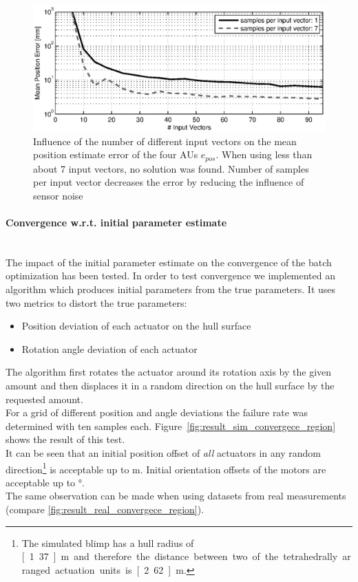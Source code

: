 \begin{figure}[hbtp]
\centering
\includegraphics[width = \textwidth]{images/results/input_length_vs_position_error.eps}
\caption{Influence of the number of different input vectors on the mean position estimate error of the four AUs $e_{pos}$.
When using less than about 7 input vectors, no solution was found.
Number of samples per input vector decreases the error by reducing the influence of sensor noise}
\label{fig:result_inputlength}
\end{figure}

\paragraph{Convergence w.r.t. initial parameter estimate} ~\\
The impact of the initial parameter estimate on the convergence of the batch optimization has been tested.
In order to test convergence we implemented an algorithm which produces initial parameters from the true parameters.
It uses two metrics to distort the true parameters:
\begin{itemize}
\item Position deviation of each actuator on the hull surface
\item Rotation angle deviation of each actuator
\end{itemize}
The algorithm first rotates the actuator around its rotation axis by the given amount and then displaces it in a random direction on the hull surface by the requested amount. \\
For a grid of different position and angle deviations the failure rate was determined with ten samples each.
Figure~\ref{fig:result_sim_convergece_region} shows the result of this test.\\
It can be seen that an initial position offset of \textit{all} actuators in any random direction\footnote{
The simulated blimp has a hull radius of \unit[1.37]{m} and therefore the distance between two of the tetrahedrally arranged actuation units is \unit[2.62]{m}.}
is acceptable up to \unit[1]{m}.
Initial orientation offsets of the motors are acceptable up to \unit[120]{°}.
\\
The same observation can be made when using datasets from real measurements (compare \cref{fig:result_real_convergece_region}).


